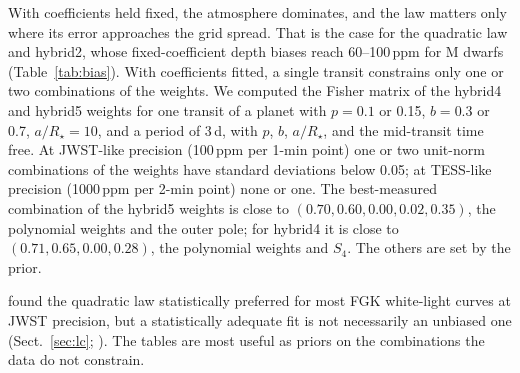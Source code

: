 \documentclass{aa}
\newcommand{\ppm}{\,\textrm{ppm}}
\begin{document}
With coefficients held fixed, the atmosphere dominates, and the law matters
only where its error approaches the grid spread. That is the case for the
quadratic law and hybrid2, whose fixed-coefficient depth biases reach
60--100\ppm{} for M dwarfs (Table~\ref{tab:bias}). With coefficients fitted, a
single transit constrains only one or two combinations of the weights. We
computed the Fisher matrix of the hybrid4 and hybrid5 weights for one transit
of a planet with $p=0.1$ or 0.15, $b=0.3$ or 0.7, $a/R_\star=10$, and a period
of 3\,d, with $p$, $b$, $a/R_\star$, and the mid-transit time free. At JWST-like
precision (100\ppm{} per 1-min point) one or two unit-norm combinations of the
weights have standard deviations below 0.05; at TESS-like precision (1000\ppm{}
per 2-min point) none or one. The best-measured combination of the hybrid5
weights is close to $(0.70,0.60,0.00,0.02,0.35)$, the polynomial weights and
the outer pole; for hybrid4 it is close to $(0.71,0.65,0.00,0.28)$,
the polynomial weights and $S_4$. The others are set by the prior.

\citet{sing2026} found the quadratic law statistically preferred for most
FGK white-light curves at JWST precision, but a statistically adequate fit is
not necessarily an unbiased one (Sect.~\ref{sec:lc};
\citealt{howarth2011,espinoza2016}). The tables are most useful as priors on
the combinations the data do not constrain.
\end{document}
